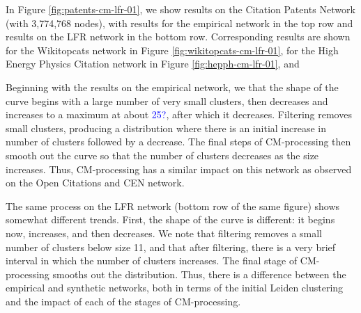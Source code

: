 \documentclass[11pt]{article}   	%
\begin{document}
In Figure \ref{fig:patents-cm-lfr-01}, we show results on the Citation Patents Network  (with 3,774,768 nodes), with results for the
empirical  network in the top row and results on the LFR network in the bottom row.  
Corresponding results are shown for the Wikitopcats network in Figure \ref{fig:wikitopcats-cm-lfr-01}, for the High Energy Physics Citation network 
in Figure \ref{fig:hepph-cm-lfr-01}, and 


Beginning with the results on the empirical network, we that the shape of the curve begins with a large number of very small clusters, then decreases and increases to a maximum
at about \textcolor{blue}{25?}, after which it decreases. 
Filtering removes small clusters, producing a distribution where there is an initial increase in number of clusters
followed by a decrease.  The final  steps of CM-processing then smooth out the curve so that the number of clusters decreases as the size increases.
Thus, CM-processing has a similar impact on this network as observed on the Open Citations and CEN network.

The same process on the LFR network (bottom row of the same figure) shows  somewhat different trends.
First, the shape of the curve is different: it begins now, increases, and then decreases.
We note that filtering removes a small number of clusters below size 11, and that 
after filtering, there is a very brief interval in which the number of clusters increases. 
The final stage of CM-processing smooths out the distribution.  
Thus, there is a difference between the empirical and synthetic networks, both in terms of the initial Leiden clustering and the impact of each of
the stages of CM-processing. 
\end{document}
